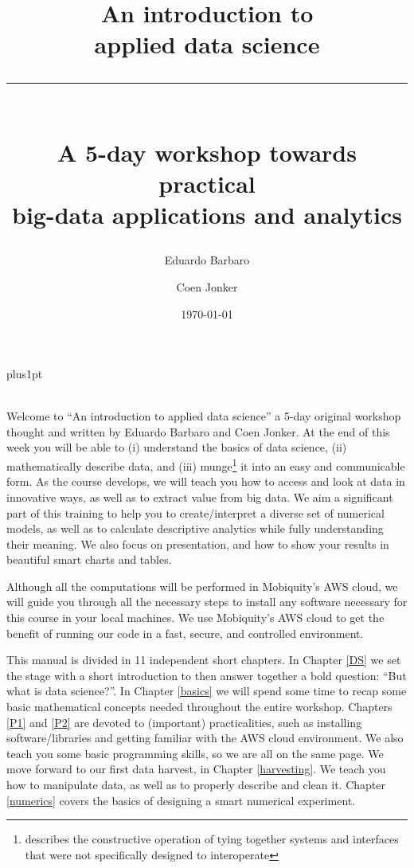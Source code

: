 \documentclass[10pt]{PhDthesisPSnPDF}%
\title{\Huge{An introduction to \\ applied data science} \\ 
\rule{100mm}{5pt} \\
\Large{A 5-day workshop towards practical \\ big-data applications and analytics}}
\author{\Large{Eduardo Barbaro}}
\author{\Large{Coen Jonker}}
\affil{\normalsize Data Scientistists at Mobiquity Inc}
\date{\today}
\begin{document}
\renewcommand\baselinestretch{1}
\baselineskip=14pt plus1pt

\maketitle


 \\

Welcome to ``An introduction to applied data science'' a 5-day original workshop thought and written by Eduardo Barbaro and Coen Jonker. At the end of this week you will be able to (i) understand the basics of data science, (ii) mathematically describe data, and (iii) munge\footnote{describes the constructive operation of tying together systems and interfaces that were not specifically designed to interoperate} it into an easy and communicable form. As the course develops, we will teach you how to access and look at data in innovative ways, as well as to extract value from big data. We aim a significant part of this training to help you to create/interpret a diverse set of numerical models, as well as to calculate descriptive analytics while fully understanding their meaning. We also focus on presentation, and how to show your results in beautiful smart charts and tables.

Although all the computations will be performed in Mobiquity's AWS cloud, we will guide you through all the necessary steps to install any software necessary for this course in your local machines. We use Mobiquity's AWS cloud to get the benefit of running our code in a fast, secure, and controlled environment.

This manual is divided in 11 independent short chapters. In Chapter \ref{DS} we set the stage with a short introduction to then answer together a bold question: ``But what is data science?''. In Chapter \ref{basics} we will spend some time to recap some basic mathematical concepts needed throughout the entire workshop. Chapters \ref{P1} and \ref{P2} are devoted to (important) practicalities, such as installing software/libraries and getting familiar with the AWS cloud environment. We also teach you some basic programming skills, so we are all on the same page. We move forward to our first data harvest, in Chapter \ref{harvesting}. We teach you how to manipulate data, as well as to properly describe and clean it. Chapter \ref{numerics} covers the basics of designing a smart numerical experiment. 
\end{document}
